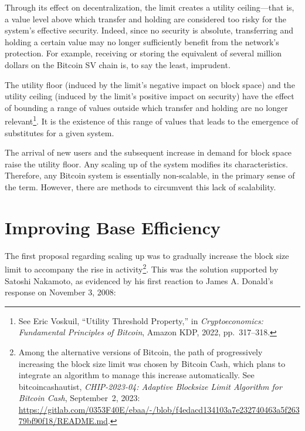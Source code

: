 \documentclass[
  a5paper,
  smalldemyvopaper,10pt,twoside,onecolumn,openright,extrafontsizes,hidelinks]{memoir}
\begin{document}
Through its effect on decentralization, the limit creates a utility
ceiling---that is, a value level above which transfer and holding are
considered too risky for the system's effective security. Indeed, since
no security is absolute, transferring and holding a certain value may no
longer sufficiently benefit from the network's protection. For example,
receiving or storing the equivalent of several million dollars on the
Bitcoin SV chain is, to say the least, imprudent.

The utility floor (induced by the limit's negative impact on block
space) and the utility ceiling (induced by the limit's positive impact
on security) have the effect of bounding a range of values outside which
transfer and holding are no longer relevant\footnote{See Eric Voskuil,
  ``Utility Threshold Property,'' in \emph{Cryptoeconomics: Fundamental
  Principles of Bitcoin}, Amazon KDP, 2022, pp.~317--318.}. It is the
existence of this range of values that leads to the emergence of
substitutes for a given system.

The arrival of new users and the subsequent increase in demand for block
space raise the utility floor. Any scaling up of the system modifies its
characteristics. Therefore, any Bitcoin system is essentially
non-scalable, in the primary sense of the term. However, there are
methods to circumvent this lack of scalability.

\section*{Improving Base Efficiency}\label{improving-base-efficiency}


The first proposal regarding scaling up was to gradually increase the
block size limit to accompany the rise in activity\footnote{Among the
  alternative versions of Bitcoin, the path of progressively increasing
  the block size limit was chosen by Bitcoin Cash, which plans to
  integrate an algorithm to manage this increase automatically. See
  bitcoincashautist, \emph{CHIP-2023-04: Adaptive Blocksize Limit
  Algorithm for Bitcoin Cash}, September~2, 2023:
  \url{https://gitlab.com/0353F40E/ebaa/-/blob/f4edacd134103a7e232740463a5f26379bf90f18/README.md}.}.
This was the solution supported by Satoshi Nakamoto, as evidenced by his
first reaction to James A. Donald's response on November 3, 2008:
\end{document}
